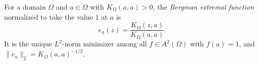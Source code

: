 
For a domain $\Omega$ and $a\in\Omega$ with $K_\Omega(a,a)>0$, the \emph{Bergman extremal function} normalized to take the value $1$ at $a$ is
\[
e_a(z)=\frac{K_\Omega(z,a)}{K_\Omega(a,a)}.
\]
It is the unique $L^2$-norm minimizer among all $f\in A^2(\Omega)$ with $f(a)=1$, and $\|e_a\|_2=K_\Omega(a,a)^{-1/2}$.
